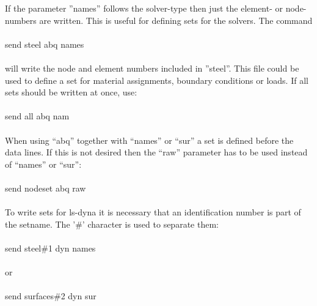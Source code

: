 \documentclass{article}
\begin{document}
If the parameter ''names'' follows the solver-type then just the element- or node-numbers are written. This is useful for defining sets for the solvers. The command\\\\send steel abq names\\\\will write the node and element numbers included in ''steel''. This file could be used to define a set for material assignments, boundary conditions or loads. If all sets should be written at once, use:\\\\send all abq nam\\\\When using ``abq'' together with ``names'' or ``sur'' a set is defined before the data lines. If this is not desired then the ``raw'' parameter has to be used instead of ``names'' or ``sur'':\\\\send nodeset abq raw\\\\To write sets for ls-dyna it is necessary that an identification number is part of the setname. The '\#' character is used to separate them:\\\\send steel\#1 dyn names\\\\or\\\\send surfaces\#2 dyn sur\\\\
\end{document}
